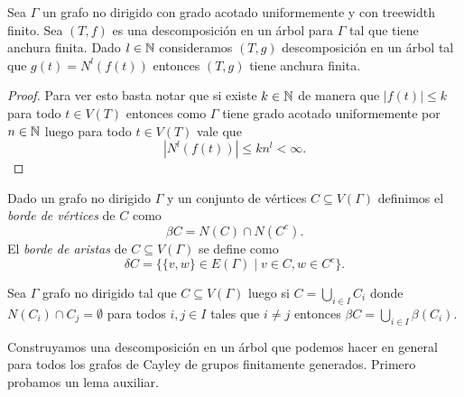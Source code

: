 \documentclass[tesis.tex]{subfiles}
\begin{document}
\medskip

\begin{coro}\label{coro_vecinos_anchura_grado}
	Sea $\Gamma$ un grafo no dirigido con grado acotado uniformemente y con treewidth finito. Sea $(T,f)$ es una descomposición en un árbol para $\Gamma$ tal que tiene anchura finita. Dado $l \in \mathbb{N}$ consideramos $(T,g)$ descomposición en un árbol tal que 
	$g(t) = N^l(f(t))$  entonces $(T,g)$ tiene anchura finita.
\end{coro}
\begin{proof}
	Para ver esto basta notar que si existe $k \in \mathbb{N}$ de manera que  $|f(t)| \le k$ para todo $t \in V(T)$ entonces como $\Gamma$ tiene grado acotado uniformemente por $n \in \mathbb{N}$ luego para todo $t \in V(T)$ vale que
	\[
		|N^{l} (f(t))| \le kn^{l} < \infty.
	\]
	
\end{proof}

\begin{deff}
	Dado un grafo no dirigido $\Gamma$ y un conjunto de vértices $C \subseteq V(\Gamma)$ definimos el \emph{borde de vértices} de $C$ como
	\[
	\beta C =  N(C) \cap N({ C^{c}}).
	\] 
	El \emph{borde de aristas} de $C \subseteq V(\Gamma)$ se define como
	\[
	\delta C = \{  \{v,w \} \in E(\Gamma) \mid v \in C, w \in  C^{c}    \}.
	\]
\end{deff}
\begin{obs}
	\label{obs:beta_separa_componentes}
	Sea $\Gamma$ grafo no dirigido tal que $C \subseteq V(\Gamma)$ luego si  $C = \bigcup_{i \in I} C_{i}$ donde $N(C_{i}) \cap C_{j} = \emptyset$ para todos $i,j \in I$ tales que $i \neq j$ entonces $\beta C = \bigcup_{i \in I} \beta(C_{i})$.
\end{obs}

Construyamos una descomposición en un árbol que podemos hacer en general para todos los grafos de Cayley de grupos finitamente generados. 
Primero probamos un lema auxiliar.
\newpage
\end{document}
